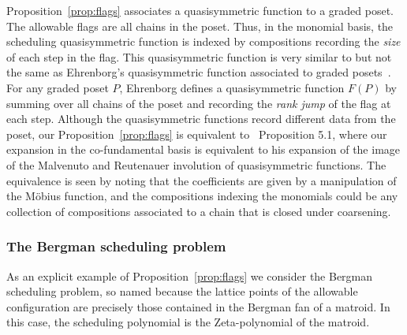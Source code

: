 \documentclass[12pt,reqno]{amsart}
\numberwithin{definition}{section}
\theoremstyle{definition}
\begin{document}
Proposition~\ref{prop:flags} associates a quasisymmetric function to a
graded poset.  The allowable flags are all chains in the poset.  Thus,
in the monomial basis, the scheduling quasisymmetric function is indexed
by compositions recording the \emph{size} of each step in the flag.  This
quasisymmetric function is very similar to but not the same as
Ehrenborg's quasisymmetric function associated to graded
posets~\cite{Ehrenborg}.  For any graded poset $P$, Ehrenborg defines
a quasisymmetric function $F(P)$ by summing over all chains of the
poset and recording the \emph{rank jump} of the flag at each step.  Although
the quasisymmetric functions record different data from the poset, our
Proposition~\ref{prop:flags} is equivalent to
~\cite{Ehrenborg}Proposition 5.1, where our expansion in the
co-fundamental basis is equivalent to his expansion of the image of
the Malvenuto and Reutenauer involution of quasisymmetric functions.
The equivalence is seen by noting that the coefficients are given by a
manipulation of the M\"obius function, and the compositions indexing the
monomials could be any collection of compositions associated to a
chain that is closed under coarsening.




\subsubsection{The Bergman scheduling problem} As an explicit example of Proposition~\ref{prop:flags} we consider the Bergman
scheduling problem, so named because the lattice points of the
allowable configuration are precisely those contained in the Bergman
fan of a matroid. In this case, the scheduling polynomial is the
Zeta-polynomial of the matroid.
\end{document}
